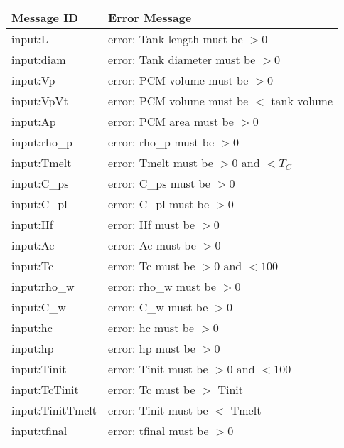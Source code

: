 \documentclass[12pt]{article}
\begin{document}
\begin{table}[!h]
\caption{Possible Exceptions} \label{TblExceptions}
\renewcommand{\arraystretch}{1.2}
\noindent \begin{longtable*}{l l} 
  \toprule
  \textbf{Message ID} & \textbf{Error Message}\\
  \midrule
	input:L &error: Tank length must be $> 0$ \\ 
	input:diam &error: Tank diameter must be $> 0$ \\ 
	input:Vp &error: PCM volume must be $> 0$ \\ 
	input:VpVt &error: PCM volume must be $<$ tank volume \\ 
	input:Ap &error: PCM area must be $> 0$ \\
	input:rho\_p &error: rho\_p must be $> 0$ \\ 
	input:Tmelt &error: Tmelt must be $> 0$ and $< T_C$ \\ 
	input:C\_ps &error: C\_ps must be $> 0$ \\ 
	input:C\_pl &error: C\_pl must be $> 0$ \\ 
	input:Hf &error: Hf must be $> 0$ \\ 
	input:Ac &error: Ac must be $> 0$ \\ 
	input:Tc &error: Tc must be $> 0 \text{ and } < 100$ \\ 
	input:rho\_w &error: rho\_w must be $> 0$ \\ 
	input:C\_w &error: C\_w must be $> 0$ \\ 
	input:hc &error: hc must be $> 0$ \\ 
	input:hp &error: hp must be $> 0$ \\ 
	input:Tinit &error: Tinit must be $> 0$ and $< 100$ \\ 
	input:TcTinit &error: Tc must be $>$ Tinit \\ 
	input:TinitTmelt &error: Tinit must be $<$ Tmelt \\ 
	input:tfinal &error: tfinal must be $> 0$ \\ 
  \bottomrule
\end{longtable*}
\end{table}
\end{document}
